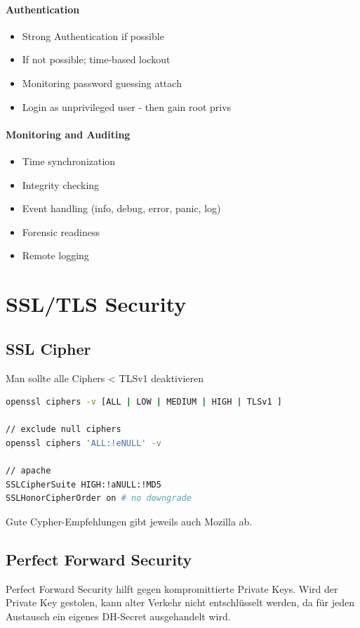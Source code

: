 \paragraph{Authentication}
\begin{itemize}
	\item Strong Authentication if possible
	\item If not possible; time-based lockout
	\item Monitoring password guessing attach
	\item Login as unprivileged user - then gain root privs
\end{itemize}

\paragraph{Monitoring and Auditing}
\begin{itemize}
	\item Time synchronization
	\item Integrity checking
	\item Event handling (info, debug, error, panic, log)
	\item Forensic readiness
	\item Remote logging
\end{itemize}

\section{SSL/TLS Security}

\subsection{SSL Cipher}
Man sollte alle Ciphers < TLSv1 deaktivieren
\begin{lstlisting}[language=bash]
openssl ciphers -v [ALL | LOW | MEDIUM | HIGH | TLSv1 ]

// exclude null ciphers
openssl ciphers 'ALL:!eNULL' -v

// apache
SSLCipherSuite HIGH:!aNULL:!MD5
SSLHonorCipherOrder on # no downgrade
\end{lstlisting}

Gute Cypher-Empfehlungen gibt jeweils auch Mozilla ab.

\subsection{Perfect Forward Security}
Perfect Forward Security hilft gegen kompromittierte Private Keys. Wird der Private Key gestolen, kann alter Verkehr nicht entschlüsselt werden, da für jeden Austausch ein eigenes DH-Secret ausgehandelt wird.

